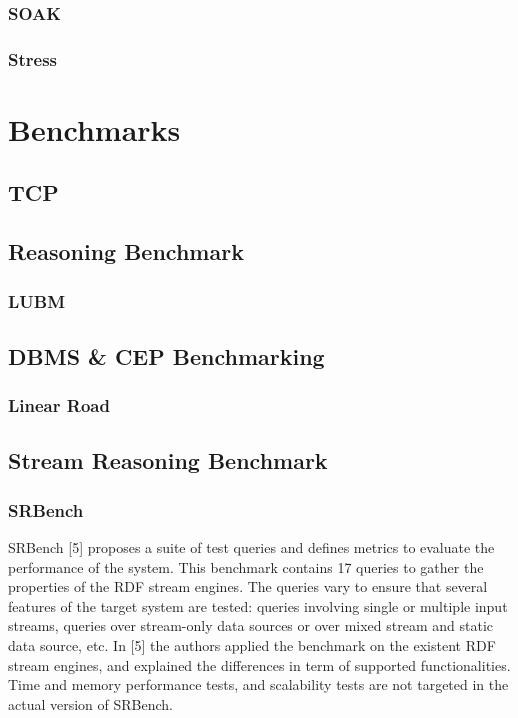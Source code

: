 \subsubsection{SOAK}
\subsubsection{Stress}

\section{Benchmarks}
\subsection{TCP}  \label{sec:tcp}


\subsection{Reasoning Benchmark}
\subsubsection{LUBM}
\subsection{DBMS \& CEP Benchmarking}
\subsubsection{Linear Road}
\subsection{Stream Reasoning Benchmark}
\subsubsection{SRBench}
SRBench [5] proposes a suite of test queries and defines metrics to evaluate the
performance of the system. This benchmark contains 17 queries to gather the
properties of the RDF stream engines. The queries vary to ensure that several
features of the target system are tested: queries involving single or multiple input
streams, queries over stream-only data sources or over mixed stream and static
data source, etc. In [5] the authors applied the benchmark on the existent RDF
stream engines, and explained the differences in term of supported functionalities.
Time and memory performance tests, and scalability tests are not targeted
in the actual version of SRBench.
